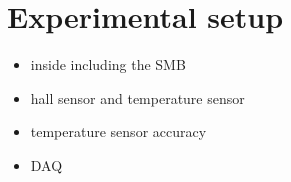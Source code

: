 \section{Experimental setup}
\begin{itemize}
\item inside including the SMB
\item hall sensor and temperature sensor
\item temperature sensor accuracy
\item DAQ
\end{itemize}
